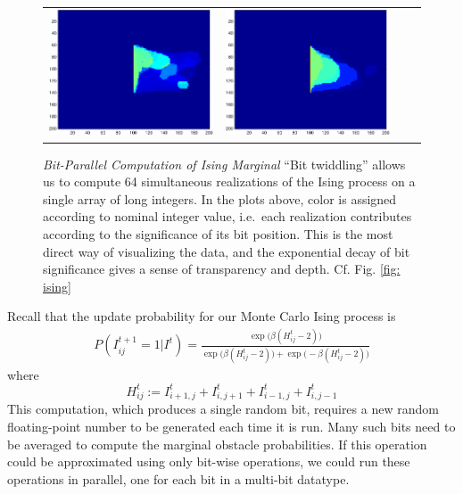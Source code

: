 \begin{figure}
\begin{tabular}{cccc}
\includegraphics[height=.75in, trim={.7cm .6cm .7cm .6cm}, clip]{Parallel_Bits/par225}&
\includegraphics[height=.75in, trim={.7cm .6cm .7cm .6cm}, clip]{Parallel_Bits/par400}
\end{tabular}
\caption{\emph{Bit-Parallel Computation of Ising Marginal}
``Bit twiddling'' allows us to compute 64 simultaneous realizations of the Ising process
on a single array of long integers.  In the plots above, color is assigned according
to nominal integer value,
i.e.\, each realization contributes according to the significance of its bit position.
This is the most direct way of visualizing the data, and the exponential decay of bit
significance gives a sense of transparency and depth. Cf. Fig. \ref{fig: ising}
}
\end{figure}

Recall that the update probability for our Monte Carlo Ising process is
\def\bI{\bar{I}}
\def\ber{\operatorname{Bernoulli}}
\begin{align}
P(I^{t+1}_{ij} = 1|I^t) = \frac{\exp\bigl(\beta (H_{ij}^t-2)\bigr)}
{\exp\bigl(\beta (H_{ij}^t-2) \bigr) + \exp\bigl(-\beta (H_{ij}^t-2) \bigr)}
\end{align}
where
$$H_{ij}^t := I^t_{i+1,j} + I^t_{i,j+1} + I^t_{i-1,j} + I^t_{i,j-1}$$
This computation, which produces a single random bit, requires a new random floating-point number to be generated each time it is run.  
Many such bits need to be averaged to compute the marginal obstacle probabilities.
If this operation could be approximated using only bit-wise operations, we could run these operations in parallel, one for each
bit in a multi-bit datatype.  
